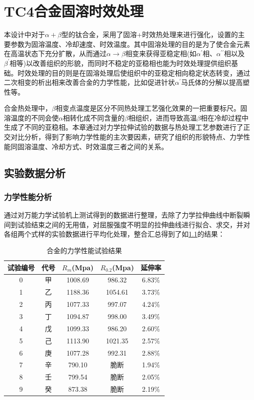 \chapter{TC4合金固溶时效处理}

本设计中对于$\alpha+\beta$型的\ti 钛合金，采用了固溶+时效热处理来进行强化，设置的主要参数为固溶温度、冷却速度、时效温度\cite{mirror1,ranxingGurongwenduduiTi6Al4VELItaihejinxianweizuzhijixingnengdeyingxiang2021}。其中固溶处理的目的是为了使合金元素在高温状态下充分扩散，从而通过$\alpha \to \beta$相变来获得亚稳定相(如$\alpha^{\prime}$相、$\alpha^{\prime\prime}$相以及$\beta^{\prime}$相等)以改善组织的形貌，而同时不稳定的亚稳相也能为时效处理提供组织基础。时效处理的目的则是在固溶处理后使组织中的亚稳定相向稳定状态转变，通过二次相变的析出相来改善合金的力学性能，比如促进针状$\alpha^\prime$马氏体的分解以提高塑性等。

\ti 合金热处理中，$\beta$相变点温度是区分不同热处理工艺强化效果的一把重要标尺。固溶温度的不同会使$\alpha$相转化成不同含量的$\beta$相组织，进而导致高温$\beta$相在冷却过程中生成了不同的亚稳相。本章通过对力学拉伸试验的数据与热处理工艺参数进行了正交对比分析，得到了影响力学性能的主次要因素，研究了组织的形貌特点、力学性能同固溶温度、冷却方式、时效温度三者之间的关系。
\section{实验数据分析}
\subsection{力学性能分析}
通过对万能力学试验机上测试得到的数据进行整理，去除了力学拉伸曲线中断裂瞬间到试验结束之间的无用值，对屈服强度不明显的拉伸曲线进行拟合、求交，并对各组两个式样的实验数据进行平均化处理，整合汇总得到了如\ref{sec:mystrength}的结果：%
\begin{table}[htbp]
	\centering
	\caption{\ti 合金的力学性能试验结果}
	\label{sec:mystrength}
	\begin{tabular}{ccccc}
		\toprule
		试验编号& 代号&$ R_m $(Mpa)&$ R_{0.2} $(Mpa)&延伸率 \\
		\midrule
		0 & 甲 & 1008.69 &986.32& 6.83$\%$ \\
		1 & 乙 & 1188.36 &1054.61 &3.73$\%$ \\
		2 & 丙 & 1077.33 & 997.07&4.24$\%$ \\
		3 & 丁 & 1094.87 & 998.00&3.49$\%$ \\
		4 & 戊 & 1099.33 &986.20 &2.60$\%$ \\
		5 & 己 & 1113.90 & 1021.35&2.57$\%$ \\
		6 & 庚 & 1077.28 &992.31& 2.88$\%$ \\
		7 & 辛 & 790.10 & 脆断&1.94$\%$ \\
		8 & 壬 & 799.54 &脆断& 2.05$\%$ \\
		9 & 癸 & 873.38 & 脆断&2.19$\%$ \\
		\bottomrule
	\end{tabular}
\end{table}

